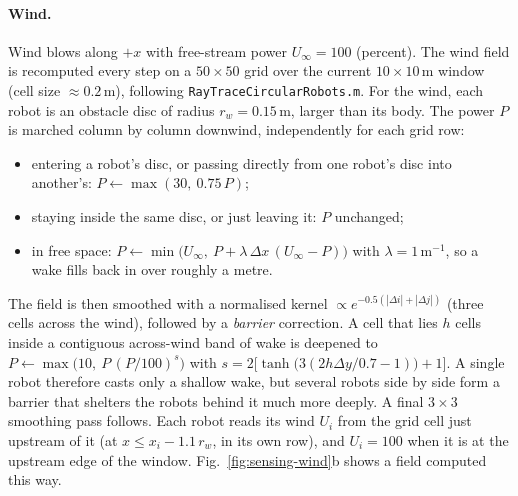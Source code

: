\documentclass[11pt]{article}
\begin{document}
\paragraph{Wind.} Wind blows along $+x$ with free-stream power $U_\infty = 100$ (percent). The
wind field is recomputed every step on a $50\times50$ grid over the current $10\times10$\,m
window (cell size $\approx 0.2$\,m), following \texttt{RayTraceCircularRobots.m}. For the
wind, each robot is an obstacle disc of radius $r_w = 0.15$\,m, larger than its body. The
power $P$ is marched column by column downwind, independently for each grid row:
\begin{itemize}
\item entering a robot's disc, or passing directly from one robot's disc into another's:
      $P \leftarrow \max(30,\ 0.75\,P)$;
\item staying inside the same disc, or just leaving it: $P$ unchanged;
\item in free space: $P \leftarrow \min\big(U_\infty,\ P + \lambda\,\Delta x\,(U_\infty - P)\big)$
      with $\lambda = 1\,\text{m}^{-1}$, so a wake fills back in over roughly a metre.
\end{itemize}
The field is then smoothed with a normalised kernel $\propto e^{-0.5(|\Delta i| + |\Delta j|)}$
(three cells across the wind), followed by a \emph{barrier} correction. A cell that lies
$h$ cells inside a contiguous across-wind band of wake is deepened to
$P \leftarrow \max\big(10,\ P\,(P/100)^{s}\big)$ with
$s = 2\big[\tanh\big(3(2h\Delta y/0.7 - 1)\big) + 1\big]$. A single robot therefore casts
only a shallow wake, but several robots side by side form a barrier that shelters the robots
behind it much more deeply. A final $3\times3$ smoothing pass follows. Each robot reads its
wind $U_i$ from the grid cell just upstream of it (at $x \le x_i - 1.1\,r_w$, in its own row),
and $U_i = 100$ when it is at the upstream edge of the window.
Fig.~\ref{fig:sensing-wind}b shows a field computed this way.
\end{document}
